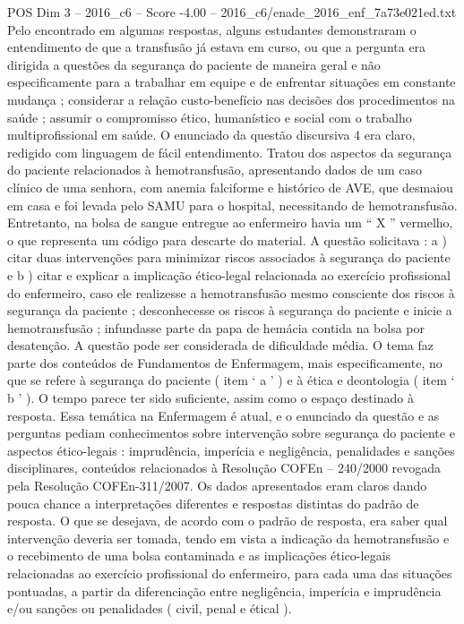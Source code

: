 \begin{textsample}{POS Dim 3 – 2016\_c6 – Score -4.00 – 2016\_c6/enade\_2016\_enf\_7a73e021ed.txt}
Pelo encontrado em algumas respostas, alguns estudantes demonstraram o entendimento de que a transfusão já estava em curso, ou que a pergunta era dirigida a questões da segurança do paciente de maneira geral e não especificamente para a trabalhar em equipe e de enfrentar situações em constante mudança ; considerar a relação custo-benefício nas decisões dos procedimentos na saúde ; assumir o compromisso ético, humanístico e social com o trabalho multiprofissional em saúde.
O enunciado da questão discursiva 4 era claro, redigido com linguagem de fácil entendimento.
Tratou dos aspectos da segurança do paciente relacionados à hemotransfusão, apresentando dados de um caso clínico de uma senhora, com anemia falciforme e histórico de AVE, que desmaiou em casa e foi levada pelo SAMU para o hospital, necessitando de hemotransfusão.
Entretanto, na bolsa de sangue entregue ao enfermeiro havia um “ X ” vermelho, o que representa um código para descarte do material.
A questão solicitava : a ) citar duas intervenções para minimizar riscos associados à segurança do paciente e b ) citar e explicar a implicação ético-legal relacionada ao exercício profissional do enfermeiro, caso ele realizesse a hemotransfusão mesmo consciente dos riscos à segurança da paciente ; desconhecesse os riscos à segurança do paciente e inicie a hemotransfusão ; infundasse parte da papa de hemácia contida na bolsa por desatenção.
A questão pode ser considerada de dificuldade média.
O tema faz parte dos conteúdos de Fundamentos de Enfermagem, mais especificamente, no que se refere à segurança do paciente ( item ‘ a ’ ) e à ética e deontologia ( item ‘ b ’ ).
O tempo parece ter sido suficiente, assim como o espaço destinado à resposta.
Essa temática na Enfermagem é atual, e o enunciado da questão e as perguntas pediam conhecimentos sobre intervenção sobre segurança do paciente e aspectos ético-legais : imprudência, imperícia e negligência, penalidades e sanções disciplinares, conteúdos relacionados à Resolução COFEn – 240/2000 revogada pela Resolução COFEn-311/2007.
Os dados apresentados eram claros dando pouca chance a interpretações diferentes e respostas distintas do padrão de resposta.
O que se desejava, de acordo com o padrão de resposta, era saber qual intervenção deveria ser tomada, tendo em vista a indicação da hemotransfusão e o recebimento de uma bolsa contaminada e as implicações ético-legais relacionadas ao exercício profissional do enfermeiro, para cada uma das situações pontuadas, a partir da diferenciação entre negligência, imperícia e imprudência e/ou sanções ou penalidades ( civil, penal e étical ).

\end{textsample}
